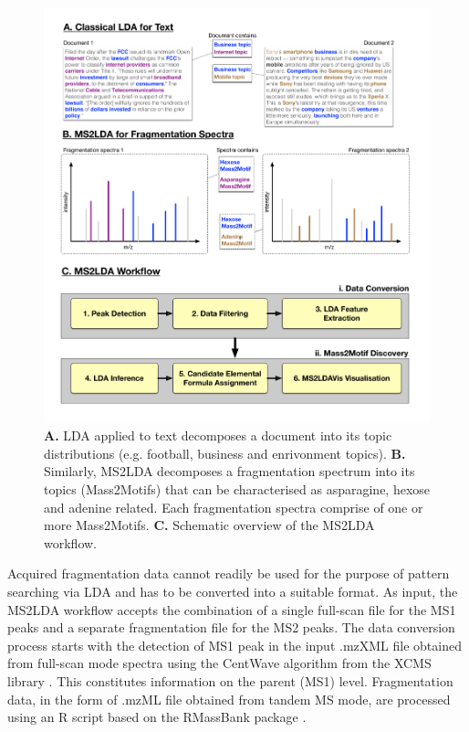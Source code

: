 \begin{figure}[!htbp]
\centering\includegraphics[width=1.0\linewidth]{07-lda/figures/text2frags_new.pdf}
\centering\caption{\textbf{A.} LDA applied to text decomposes a document into its topic distributions (e.g. football, business and enrivonment topics). \textbf{B.} Similarly, MS2LDA decomposes a fragmentation spectrum into its topics (Mass2Motifs) that can be characterised as asparagine, hexose and adenine related. Each fragmentation spectra comprise of one or more Mass2Motifs. \textbf{C.} Schematic overview of the MS2LDA workflow.\label{fig:text2frags}}
\end{figure}

Acquired fragmentation data cannot readily be used for the purpose of pattern searching via LDA and has to be converted into a suitable format. As input, the MS2LDA workflow accepts the combination of a single full-scan file for the MS1 peaks and a separate fragmentation file for the MS2 peaks. The data conversion process starts with the detection of MS1 peak in the input .mzXML file obtained from full-scan mode spectra using the CentWave algorithm from the XCMS library \cite{Smith2006}. This constitutes information on the parent (MS1) level. Fragmentation data, in the form of .mzML file obtained from tandem MS mode, are processed using an R script based on the RMassBank package \cite{Stravs2013}. 

